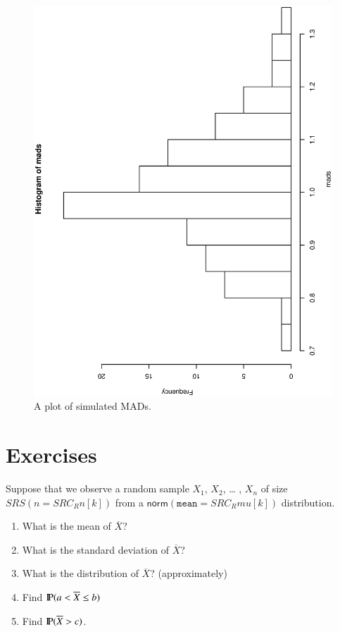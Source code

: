 \documentclass[captions=tableheading]{scrbook}
\begin{document}
\begin{figure}[th]
  \includegraphics[angle=270, totalheight=4in]{ps/simulated-MAD.ps}
  \caption[Plot of simulated MADs]{\small A plot of simulated MADs.}
  \label{fig:simulated-MAD}
\end{figure}

\newpage{}
\section{Exercises}
\label{sec-8-6}

\setcounter{thm}{0}



\begin{xca}
Suppose that we observe a random sample \(X_{1}\), \(X_{2}\), \ldots{} , \(X_{n}\) of size \( SRS( n =  SRC_R{n[k]} ) \) from a \( \mathsf{norm}(\mathtt{mean}= SRC_R{mu[k]}) \) distribution. 
\begin{enumerate}
\item What is the mean of \(\overline{X}\)?
\item What is the standard deviation of \(\overline{X}\)?
\item What is the distribution of \(\overline{X}\)? (approximately)
\item Find \(\P(a< \overline{X} \leq b)\)
\item Find \(\P(\overline{X} > c)\).
\end{enumerate}

\end{xca}
\end{document}
